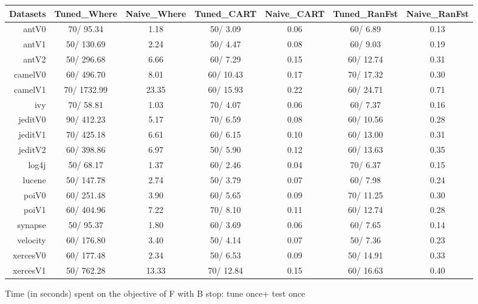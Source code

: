 \documentclass{acm_proc_article-sp}
\begin{document}
\begin{figure*}[!ht]
\scriptsize
\centering
  \begin{tabular}{r|c |c |c |c |c |c }
    \hline\hline
    Datasets & Tuned\_Where & Naive\_Where & Tuned\_CART & Naive\_CART & Tuned\_RanFst & Naive\_RanFst\\
    \hline
    antV0 & 70/ 95.34 & 1.18 & 50/ 3.09 & 0.06 & 60/ 6.89 & 0.13\\
    antV1 & 50/ 130.69 & 2.24 & 50/ 4.47 & 0.08 & 60/ 9.03 & 0.19\\
    antV2 & 50/ 296.68 & 6.66 & 60/ 7.29 & 0.15 & 60/ 12.74 & 0.31\\
    camelV0 & 60/ 496.70 & 8.01 & 60/ 10.43 & 0.17 & 70/ 17.32 & 0.30\\
    camelV1 & 70/ 1732.99 & 23.35 & 60/ 15.93 & 0.22 & 60/ 24.71 & 0.71\\
    ivy & 70/ 58.81 & 1.03 & 70/ 4.07 & 0.06 & 60/ 7.37 & 0.16\\
    jeditV0 & 90/ 412.23 & 5.17 & 70/ 6.59 & 0.08 & 60/ 10.56 & 0.28\\
    jeditV1 & 70/ 425.18 & 6.61 & 60/ 6.15 & 0.10 & 60/ 13.00 & 0.31\\
    jeditV2 & 60/ 398.86 & 6.97 & 50/ 5.90 & 0.12 & 60/ 13.63 & 0.35\\
    log4j & 50/ 68.17 & 1.37 & 60/ 2.46 & 0.04 & 70/ 6.37 & 0.15\\
    lucene & 50/ 147.78 & 2.74 & 50/ 3.79 & 0.07 & 60/ 7.98 & 0.24\\
    poiV0 & 60/ 251.48 & 3.90 & 60/ 5.65 & 0.09 & 70/ 11.25 & 0.30\\
    poiV1 & 60/ 404.96 & 7.22 & 70/ 8.10 & 0.11 & 60/ 12.74 & 0.28\\
    synapse & 50/ 95.37 & 1.80 & 60/ 3.69 & 0.06 & 60/ 7.65 & 0.14\\
    velocity & 60/ 176.80 & 3.40 & 50/ 4.14 & 0.07 & 50/ 7.36 & 0.23\\
    xercesV0 & 60/ 177.48 & 2.34 & 50/ 6.53 & 0.09 & 50/ 14.91 & 0.33\\
    xercesV1 & 50/ 762.28 & 13.33 & 70/ 12.84 & 0.15 & 60/ 16.63 & 0.40\\
  \end{tabular}
  \caption{Time (in seconds) spent on the objective of F with B stop: tune once+ test once}
\end{figure*}
\end{document}
